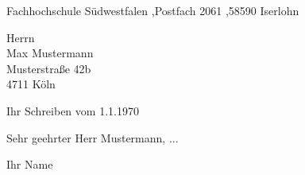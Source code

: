 \documentclass[a4paper, 10pt, parskip=off, headheight=25mm, footheight=25mm]{scrartcl}
\newcommand{\name}{Ihr Name}
\newcommand{\postfach}{Fachhochschule Südwestfalen \sep Postfach 2061 \sep 58590 Iserlohn}
\begin{document}
\begin{anschreiben}

\begin{absender}
\postfach
\end{absender}

\begin{empfaenger}
Herrn \\ Max Mustermann \\ Musterstraße 42b \\ 4711 Köln 
\end{empfaenger}

\begin{betreff}
Ihr Schreiben vom 1.1.1970
\end{betreff}

\begin{text}
Sehr geehrter Herr Mustermann, ... 
\end{text}

\vspace{15mm}
\name

\end{anschreiben}
\end{document}
